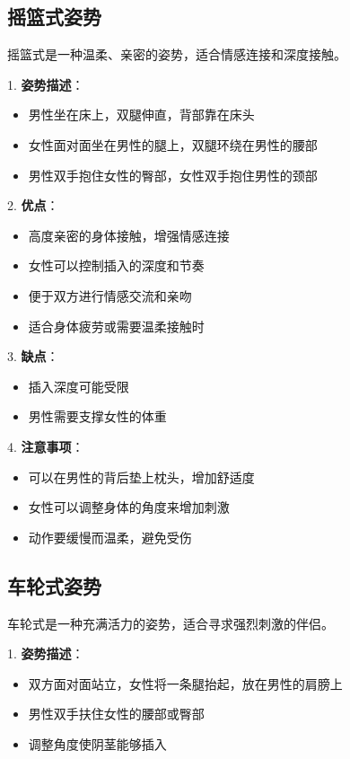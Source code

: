 \documentclass[12pt,UTF8]{ctexbook}
\begin{document}
\subsection{摇篮式姿势}

摇篮式是一种温柔、亲密的姿势，适合情感连接和深度接触。

1. \textbf{姿势描述}：
  \begin{itemize}
  \item 男性坐在床上，双腿伸直，背部靠在床头
  \item 女性面对面坐在男性的腿上，双腿环绕在男性的腰部
  \item 男性双手抱住女性的臀部，女性双手抱住男性的颈部
  \end{itemize}

2. \textbf{优点}：
  \begin{itemize}
  \item 高度亲密的身体接触，增强情感连接
  \item 女性可以控制插入的深度和节奏
  \item 便于双方进行情感交流和亲吻
  \item 适合身体疲劳或需要温柔接触时
  \end{itemize}

3. \textbf{缺点}：
  \begin{itemize}
  \item 插入深度可能受限
  \item 男性需要支撑女性的体重
  \end{itemize}

4. \textbf{注意事项}：
  \begin{itemize}
  \item 可以在男性的背后垫上枕头，增加舒适度
  \item 女性可以调整身体的角度来增加刺激
  \item 动作要缓慢而温柔，避免受伤
  \end{itemize}

\subsection{车轮式姿势}

车轮式是一种充满活力的姿势，适合寻求强烈刺激的伴侣。

1. \textbf{姿势描述}：
  \begin{itemize}
  \item 双方面对面站立，女性将一条腿抬起，放在男性的肩膀上
  \item 男性双手扶住女性的腰部或臀部
  \item 调整角度使阴茎能够插入
  \end{itemize}
\end{document}
